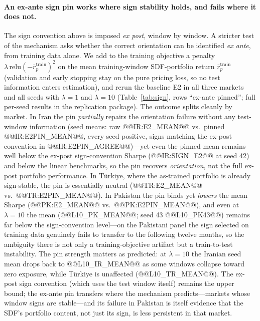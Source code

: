 \documentclass[12pt]{article}
\begin{document}
\paragraph{An ex-ante sign pin works where sign stability holds, and fails where it does not.}\label{sec:methodb} The sign convention above is imposed \emph{ex post}, window by window. A stricter test of the mechanism asks whether the correct orientation can be identified \emph{ex ante}, from training data alone. We add to the training objective a penalty $\lambda\,\mathrm{relu}(-\bar r^{\mathrm{train}}_p)^2$ on the mean training-window SDF-portfolio return $\bar r^{\mathrm{train}}_p$ (validation and early stopping stay on the pure pricing loss, so no test information enters estimation), and rerun the baseline E2 in all three markets and all seeds with $\lambda=1$ and $\lambda=10$ (Table~\ref{tab:sign}, rows ``ex-ante pinned''; full per-seed results in the replication package). The outcome splits cleanly by market. In Iran the pin \emph{partially} repairs the orientation failure without any test-window information (seed means: raw @@IR:E2_MEAN@@ vs.\ pinned @@IR:E2PIN_MEAN@@, every seed positive, signs matching the ex-post convention in @@IR:E2PIN_AGREE@@)---yet even the pinned mean remains well below the ex-post sign-convention Sharpe (@@IR:SIGN_E2@@ at seed 42) and below the linear benchmarks, so the pin recovers \emph{orientation}, not the full ex-post portfolio performance. In T\"urkiye, where the as-trained portfolio is already sign-stable, the pin is essentially neutral (@@TR:E2_MEAN@@ vs.\ @@TR:E2PIN_MEAN@@). In Pakistan the pin binds yet \emph{lowers} the mean Sharpe (@@PK:E2_MEAN@@ vs.\ @@PK:E2PIN_MEAN@@), and even at $\lambda{=}10$ the mean (@@L10_PK_MEAN@@; seed 43 @@L10_PK43@@) remains far below the sign-convention level---on the Pakistani panel the sign selected on training data genuinely fails to transfer to the following twelve months, so the ambiguity there is not only a training-objective artifact but a train-to-test instability. The pin strength matters as predicted: at $\lambda{=}10$ the Iranian seed mean drops back to @@L10_IR_MEAN@@ as some windows collapse toward zero exposure, while T\"urkiye is unaffected (@@L10_TR_MEAN@@). The ex-post sign convention (which uses the test window itself) remains the upper bound; the ex-ante pin transfers where the mechanism predicts---markets whose window signs are stable---and its failure in Pakistan is itself evidence that the SDF's portfolio content, not just its sign, is less persistent in that market.
\end{document}

